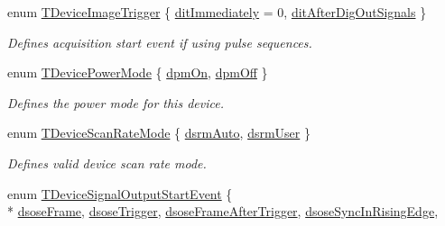 \begin{DoxyCompactItemize}
enum \hyperlink{group___device_specific_interface_ga84cf0914a0520d38dac38d96d5bc9754}{T\+Device\+Image\+Trigger} \{ \hyperlink{group___device_specific_interface_gga84cf0914a0520d38dac38d96d5bc9754ada17fb71667f4a38933827955b579b32}{dit\+Immediately} = 0, 
\hyperlink{group___device_specific_interface_gga84cf0914a0520d38dac38d96d5bc9754a7088eef8da3fad1cfe4eafa9ae269994}{dit\+After\+Dig\+Out\+Signals}
 \}
\begin{DoxyCompactList}\small\item\em Defines acquisition start event if using pulse sequences. \end{DoxyCompactList}\item 
enum \hyperlink{group___device_specific_interface_ga49794dba4ca888981afe17cdb43d427d}{T\+Device\+Power\+Mode} \{ \hyperlink{group___device_specific_interface_gga49794dba4ca888981afe17cdb43d427daed2beec25e5921b2eeaa0c0a7b103bf7}{dpm\+On}, 
\hyperlink{group___device_specific_interface_gga49794dba4ca888981afe17cdb43d427dad9594f790689d6ea7c3265a7192c4291}{dpm\+Off}
 \}
\begin{DoxyCompactList}\small\item\em Defines the power mode for this device. \end{DoxyCompactList}\item 
enum \hyperlink{group___device_specific_interface_ga7bca9cd5c970d423f2c1a2a065f3018c}{T\+Device\+Scan\+Rate\+Mode} \{ \hyperlink{group___device_specific_interface_gga7bca9cd5c970d423f2c1a2a065f3018cae1bbf61ef1050cd682120997b567360e}{dsrm\+Auto}, 
\hyperlink{group___device_specific_interface_gga7bca9cd5c970d423f2c1a2a065f3018ca42a5321b4cc23ad3ff17808b40adcecd}{dsrm\+User}
 \}
\begin{DoxyCompactList}\small\item\em Defines valid device scan rate mode. \end{DoxyCompactList}\item 
enum \hyperlink{group___device_specific_interface_ga83333b94d7a6a3f1ba96189b4e71fac0}{T\+Device\+Signal\+Output\+Start\+Event} \{ \\*
\hyperlink{group___device_specific_interface_gga83333b94d7a6a3f1ba96189b4e71fac0a99aafb305efa8461aa0cba338decd6c2}{dsose\+Frame}, 
\hyperlink{group___device_specific_interface_gga83333b94d7a6a3f1ba96189b4e71fac0af7270bc2a85d5f4026bd21ac1f9a40a3}{dsose\+Trigger}, 
\hyperlink{group___device_specific_interface_gga83333b94d7a6a3f1ba96189b4e71fac0a52ac708f981c3277ed42d0bb32995009}{dsose\+Frame\+After\+Trigger}, 
\hyperlink{group___device_specific_interface_gga83333b94d7a6a3f1ba96189b4e71fac0a8b78d537c58b0409525074be2a203aed}{dsose\+Sync\+In\+Rising\+Edge}, 

\end{DoxyCompactItemize}

